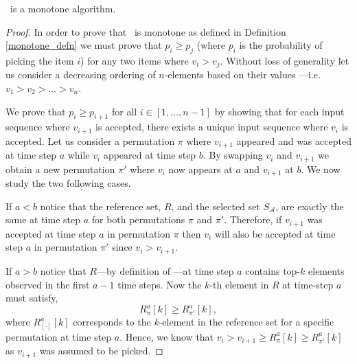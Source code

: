 \begin{lemma}
\label{lemma_monotone}
\algoname \ is a monotone algorithm. 
\end{lemma}
\begin{proof}
    In order to prove that \algoname \ is monotone as defined in Definition \ref{monotone_defn} we must prove that $p_i \geq p_j$ (where $p_i$ is the probability of picking the item $i$) for any two items where $v_i > v_j$. Without loss of generality let us consider a decreasing ordering of $n$-elements based on their values ---i.e. $v_1 > v_{2} > \dots > v_n$. 
    
    
    
    We prove that $p_i \geq p_{i+1}$ for all $i \in [1, \dots, n-1]$ by showing that for each input sequence where $v_{i+1}$ is accepted, there exists a unique input sequence where $v_i$ is accepted. Let us consider a permutation $\pi$ where $v_{i+1}$ appeared and was accepted at time step $a$ while $v_i$ appeared at time step $b$. By swapping $v_i$ and $v_{i+1}$ we obtain a new permutation $\pi'$ where $v_i$ now appears at $a$ and $v_{i+1}$ at $b$. We now study the two following cases.
    
    
    If $a < b$ notice that the reference set, $R$, and the selected set $S_{\mathcal{A}}$, are exactly the same at time step $a$ for both permutations $\pi$ and $\pi'$. Therefore, if $v_{i+1}$ was accepted at time step $a$ in permutation $\pi$ then $v_i$ will also be accepted at time step $a$ in permutation $\pi'$ since $v_i > v_{i+1}$.   

    
    If $a > b$ notice that $R$---by definition of \algoname---at time step $a$ contains top-$k$ elements observed in the first $a-1$ time steps. 
    Now the $k$-th element in $R$ at time-step $a$ must satisfy,
    \begin{equation*}
        R^a_{\pi}[k] \geq R^a_{\pi'}[k],
    \end{equation*}
    where $R^a_{[\cdot]}[k]$ corresponds to the $k$-element in the reference set for a specific permutation at time step $a$. Hence, we know that $v_{i} > v_{i+1} \geq R^a_{\pi}[k] \geq R^a_{\pi'}[k]$ as $v_{i+1}$ was assumed to be picked.
    

\end{proof}
